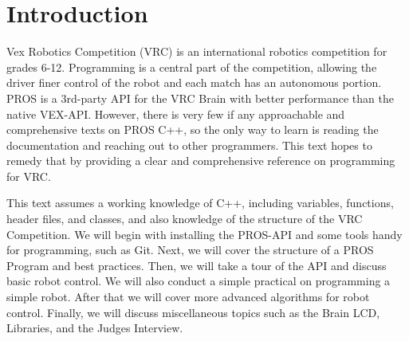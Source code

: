 \documentclass[main.tex]{subfiles}
\begin{document}
\chapter{Introduction}

Vex Robotics Competition (VRC) is an international robotics competition for grades 6-12.
Programming is a central part of the competition, allowing the driver finer control of the robot
    and each match has an autonomous portion.
PROS is a 3rd-party API for the VRC Brain with better performance than the native VEX-API.
However, there is very few if any approachable and comprehensive texts on PROS C++,
    so the only way to learn is reading the documentation and reaching out to other programmers.
This text hopes to remedy that by providing a clear and comprehensive reference on programming for VRC.

This text assumes a working knowledge of C++, including variables, functions, header files, and classes,
    and also knowledge of the structure of the VRC Competition.
We will begin with installing the PROS-API and some tools handy for programming, such as Git.
Next, we will cover the structure of a PROS Program and best practices.
Then, we will take a tour of the API and discuss basic robot control.
We will also conduct a simple practical on programming a simple robot.
After that we will cover more advanced algorithms for robot control.
Finally, we will discuss miscellaneous topics such as the Brain LCD, Libraries, and the Judges Interview.
\end{document}
